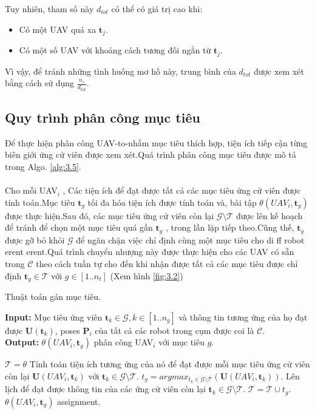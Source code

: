 \documentclass[11pt,openany]{book}
\begin{document}
\begin{algorimth}[H]
\begin{itemize}
\end{itemize}
Tuy nhiên, tham số này $d_{tot}$ có thể có giá trị cao khi:
\begin{itemize}
    \item Có một UAV quá xa $\mathbf{t}_j$.
    \item Có một số UAV với khoảng cách tương đối ngắn từ $\mathbf{t}_j$.
\end{itemize}
Vì vậy, để tránh những tình huống mơ hồ này, trung bình của $d_{tot}$ được xem xét bằng cách sử dụng $\frac{n_c}{d_{tot}}$.
\subsection{Quy trình phân công mục tiêu}
Để thực hiện phân công UAV-to-nhắm mục tiêu thích hợp, tiện ích tiếp cận từng biên giới ứng cử viên được xem xét.Quá trình phân công mục tiêu được mô tả trong Algo. \ref{alg:3.5}.\\\\
Cho mỗi UAV$_i$ , Các tiện ích để đạt được tất cả các mục tiêu ứng cử viên được tính toán.Mục tiêu $\mathbf{t}_g$ tối đa hóa tiện ích được tính toán và, bài tập $\theta(UAV_i,\mathbf{t}_g)$ được thực hiện.Sau đó, các mục tiêu ứng cử viên còn lại $\mathcal{G}\setminus \mathcal{T}$ được lên kế hoạch để tránh để chọn một mục tiêu quá gần $\mathbf{t}_g$ , trong lần lặp tiếp theo.Cũng thế, $\mathbf{t}_g$ được gỡ bỏ khỏi $\mathcal{G}$ để ngăn chặn việc chỉ định cùng một mục tiêu cho di ff robot erent erent.Quá trình chuyển nhượng này được thực hiện cho các UAV có sẵn trong $\mathcal{C}$ theo cách tuần tự cho đến khi nhận được tất cả các mục tiêu được chỉ định $\mathbf{t}_g \in \mathcal{T}$ với $g \in [1..n_t]$ (Xem hình \ref{fig:3.2})
\begin{algorithm}[H]
    \caption{Thuật toán gán mục tiêu.}
    \label{alg:3.5}
    \hspace*{\algorithmicindent} \textbf{Input:} {Mục tiêu ứng viên $\mathbf{t}_k \in \mathcal{G}, k \in [1..n_g]$ và thông tin tương ứng của họ đạt được $\mathbf{U}(\mathbf{t}_k)$, poses $\mathbf{P}_i$ của tất cả các robot trong cụm được coi là $\mathcal{C}$.}\\
    \hspace*{\algorithmicindent} \textbf{Output:} {$\theta(UAV_i,\mathbf{t}_g)$ phân công UAV$_i$ với mục tiêu $g$.}
    \begin{algorithmic}[1]
        \STATE $\mathcal{T}=\theta$
        \STATE Tính toán tiện ích tương ứng của nó để đạt được mỗi mục tiêu ứng cử viên còn lại $\mathbf{U}(UAV_i,\mathbf{t}_k)$ với $\mathbf{t}_k \in \mathcal{G}\setminus \mathcal{T}$.
        \STATE $t_g=argmax_{t_k \in \mathcal{G}\setminus \mathcal{T}}(\mathbf{U}(UAV_i,\mathbf{t}_k))$.
        \STATE Lên lịch để đạt được thông tin của các ứng cử viên còn lại $\mathbf{t}_k \in \mathcal{G} \setminus \mathcal{T}$.
        \STATE $\mathcal{T}=\mathcal{T}\cup t_g$.
        \ENDWHILE
        \RETURN $\theta(UAV_i, \mathbf{t}_g)$ assignment.
    \end{algorithmic}
\end{algorithm}

\end{algorimth}
\end{document}
